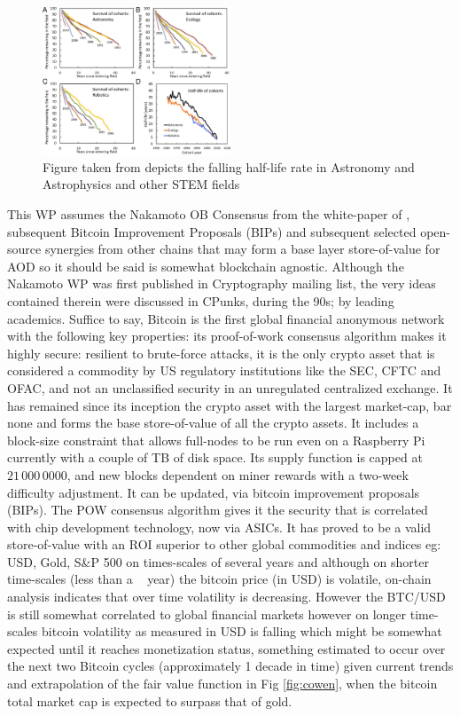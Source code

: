 \documentclass[final,5p,times,twocolumn,authoryear]{elsarticle}
\begin{document}
\begin{figure}[h!]
    \centering
  \caption{Figure taken from \cite{milo_2018} depicts the falling half-life rate in Astronomy and Astrophysics and other STEM fields}
  \label{fig:F4.large}
  \includegraphics[width=0.5\textwidth]{figs/F4.large.jpg}
\end{figure}
This WP assumes the Nakamoto OB Consensus from the white-paper of \cite{nak2009}, subsequent Bitcoin Improvement Proposals (BIPs) and subsequent selected open-source synergies from other chains that may form a base layer store-of-value for AOD so it should be said is somewhat blockchain agnostic. Although the Nakamoto WP was first published in Cryptography mailing list, the very ideas contained therein were discussed in CPunks, during the 90s; by leading academics. Suffice to say, Bitcoin is the first global financial anonymous network with the following key properties: its proof-of-work consensus algorithm makes it highly secure: resilient to brute-force attacks, it is the only crypto asset that is considered a commodity by US regulatory institutions like the SEC, CFTC and OFAC, and not an unclassified security in an unregulated centralized exchange. It has remained since its inception the crypto asset with the largest market-cap, bar none and forms the base store-of-value of all the crypto assets. It includes a block-size constraint that allows full-nodes to be run even on a Raspberry Pi currently with a couple of TB of disk space. Its supply function is capped at $21\,000\,0000$, and new blocks dependent on miner rewards with a two-week difficulty adjustment. It can be updated, via bitcoin improvement proposals (BIPs). The POW consensus algorithm gives it the security that is correlated with chip development technology, now via ASICs. It has proved to be a valid store-of-value with an ROI superior to other global commodities and indices eg: USD, Gold, S\&P 500 on times-scales of several years and although on shorter time-scales (less than a ~ year) the bitcoin price (in USD) is  volatile, on-chain analysis indicates that over time volatility is decreasing. However the BTC/USD is still somewhat correlated to global financial markets however on longer time-scales bitcoin volatility as measured in USD is falling \citep{wang2022} which might be somewhat expected until it reaches monetization status, something estimated to occur over the next two Bitcoin cycles (approximately 1 decade in time) given current trends and extrapolation of the fair value function in Fig \ref{fig:cowen},  when the bitcoin total market cap is expected to surpass that of gold. 
\end{document}
